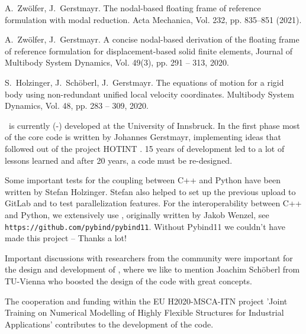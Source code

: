   \item A.\ Zw{\"o}lfer, J.\ Gerstmayr. The nodal-based floating frame of reference formulation with modal reduction. Acta Mechanica, Vol. 232, pp.  835--851 (2021). 
  \item A.\ Zw{\"o}lfer, J.\ Gerstmayr. A concise nodal-based derivation of the floating frame of reference formulation for displacement-based solid finite elements, Journal of Multibody System Dynamics, Vol. 49(3), pp. 291 -- 313, 2020. 
  \item S.\ Holzinger, J.\ Sch{\"o}berl, J.\ Gerstmayr. The equations of motion for a rigid body using non-redundant unified local velocity coordinates. Multibody System Dynamics, Vol. 48, pp. 283 -- 309, 2020. 
\ei

\codeName\ is currently (\the\month-\the\year) developed at the University of Innsbruck.
In the first phase most of the core code is written by Johannes Gerstmayr, implementing ideas that followed out of the project HOTINT \cite{GerstmayrEtAl2013}. 15 years of development led to a lot of lessons learned and after 20 years, a code must be re-designed.

Some important tests for the coupling between C++ and Python have been written by Stefan Holzinger. Stefan also helped to set up the previous upload to GitLab and to test parallelization features.
For the interoperability between C++ and Python, we extensively use \cite{pybind11}, originally written by Jakob Wenzel, see \texttt{https://github.com/pybind/pybind11}. Without Pybind11 we couldn't have made this project -- Thanks a lot!

Important discussions with researchers from the community were important for the design and development of \codeName , where we like to mention Joachim Sch{\"o}berl from TU-Vienna who boosted the design of the code with great concepts. 

The cooperation and funding within the EU H2020-MSCA-ITN project 'Joint Training on Numerical Modelling of Highly Flexible Structures for Industrial Applications' contributes to the development of the code.

